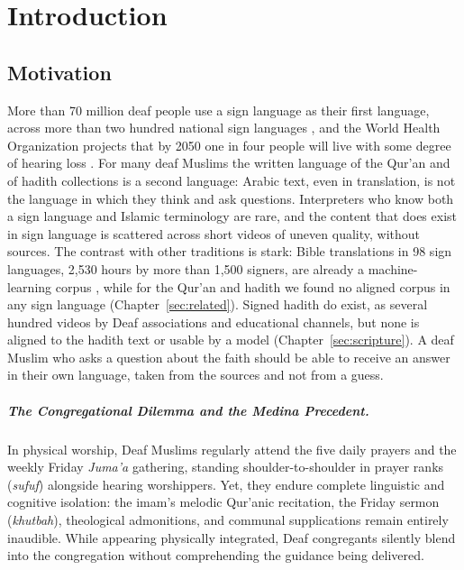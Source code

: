 \chapter{Introduction}
\label{sec:intro}

\section{Motivation}
More than 70 million deaf people use a sign language as their first language, across more than two hundred
national sign languages \cite{wfd,unsign}, and the World Health Organization projects that by 2050 one in four people
will live with some degree of hearing loss \cite{whoasl}. For many deaf Muslims the written language of the
Qur'an and of hadith collections is a second language: Arabic text, even in translation, is not the language in which
they think and ask questions. Interpreters who know both a sign language and Islamic terminology are rare, and the
content that does exist in sign language is scattered across short videos of uneven quality, without sources. The
contrast with other traditions is stark: Bible translations in 98 sign languages, 2,530 hours by more than 1,500
signers, are already a machine-learning corpus \cite{jwsign}, while for the Qur'an and hadith we found no aligned corpus
in any sign language (Chapter~\ref{sec:related}). Signed hadith do exist, as several hundred videos by Deaf associations
and educational channels, but none is aligned to the hadith text or usable by a model (Chapter~\ref{sec:scripture}). A deaf Muslim who asks a question about the faith should be able to
receive an answer in their own language, taken from the sources and not from a guess.

\paragraph{The Congregational Dilemma and the Medina Precedent.}
In physical worship, Deaf Muslims regularly attend the five daily prayers and the weekly Friday \textit{Juma'a} gathering, standing shoulder-to-shoulder in prayer ranks (\textit{sufuf}) alongside hearing worshippers. Yet, they endure complete linguistic and cognitive isolation: the imam's melodic Qur'anic recitation, the Friday sermon (\textit{khutbah}), theological admonitions, and communal supplications remain entirely inaudible. While appearing physically integrated, Deaf congregants silently blend into the congregation without comprehending the guidance being delivered.

